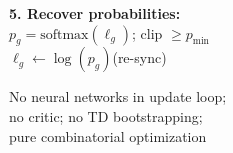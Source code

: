 \documentclass[8pt]{article}
\newlength{\colw}
\begin{document}
\begin{minipage}[t]{\colw}
\begin{keyboxG}
\textbf{5. Recover probabilities:}\\
$p_g = \text{softmax}(\ell_g)$; clip $\geq p_\text{min}$\\
$\ell_g \gets \log(p_g)$\quad(re-sync)
\end{keyboxG}

\vspace{3pt}
\begin{center}
{\scriptsize\color{black!50} No neural networks in update loop;\\
no critic; no TD bootstrapping;\\
pure combinatorial optimization}
\end{center}
\end{minipage}%
\hfill
\end{document}
